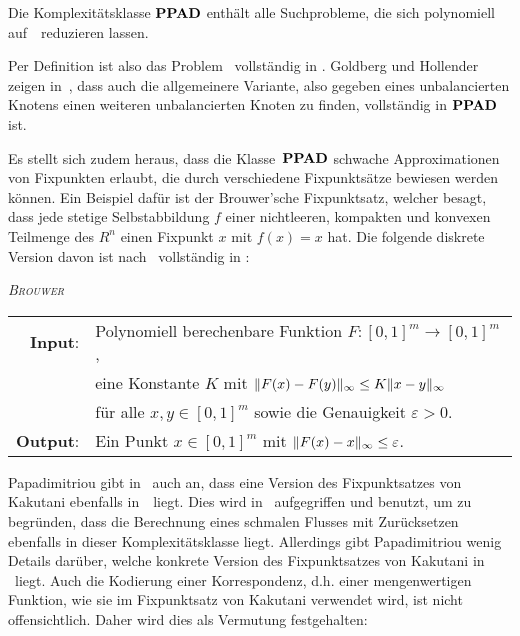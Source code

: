 \begin{definition}
	Die Komplexitätsklasse $\textbf{PPAD}$ enthält alle Suchprobleme, die sich polynomiell auf~\EndOfTheLine\ reduzieren lassen.
\end{definition}

Per Definition ist also das Problem \EndOfTheLine~vollständig in \PPAD.
Goldberg und Hollender zeigen in~\cite[Theorem 15]{hairyball}, dass auch die allgemeinere Variante, also gegeben eines unbalancierten Knotens einen weiteren unbalancierten Knoten zu finden, vollständig in $\textbf{PPAD}$ ist.

Es stellt sich zudem heraus, dass die Klasse~$\textbf{PPAD}$ schwache Approximationen von Fixpunkten erlaubt, die durch verschiedene Fixpunktsätze bewiesen werden können.
Ein Beispiel dafür ist der Brouwer'sche Fixpunktsatz, welcher besagt, dass jede stetige Selbstabbildung $f$ einer nichtleeren, kompakten und konvexen Teilmenge des $R^n$ einen Fixpunkt $x$ mit $f(x) = x$ hat.
Die folgende diskrete Version davon ist nach~\cite{DASKALAKIS2019} vollständig in \PPAD:

\newcommand{\Brouwer}{\textsc{Brouwer}}

\begin{center}
	\begin{mdframed}
		\centering
		\emph{\Brouwer} \\[1em]
		\begin{tabular}{rl}
			{\bfseries Input}: &Polynomiell berechenbare Funktion $F: [0,1]^m \rightarrow [0, 1]^m$,\\
			& eine Konstante $K$ mit $\lVert F(x) - F(y)\rVert_\infty \leq K \lVert x - y\rVert_\infty$\\
			&für alle $x,y\in[0,1]^m$ sowie die Genauigkeit $\varepsilon>0$.\\
			{\bfseries Output}: & Ein Punkt $x\in[0,1]^m$ mit $\lVert F(x) - x\rVert_\infty \leq \varepsilon$.
		\end{tabular}
	\end{mdframed}
\end{center}

Papadimitriou gibt in~\cite{PPAD1994} auch an, dass eine Version des Fixpunktsatzes von Kakutani ebenfalls in~\PPAD\ liegt.
Dies wird in~\cite{Cominetti2015} aufgegriffen und benutzt, um zu begründen, dass die Berechnung eines schmalen Flusses mit Zurücksetzen ebenfalls in dieser Komplexitätsklasse liegt.
Allerdings gibt Papadimitriou wenig Details darüber, welche konkrete Version des Fixpunktsatzes von Kakutani in \PPAD\ liegt.
Auch die Kodierung einer Korrespondenz, d.h. einer mengenwertigen Funktion, wie sie im Fixpunktsatz von Kakutani verwendet wird, ist nicht offensichtlich.
Daher wird dies als Vermutung festgehalten:

